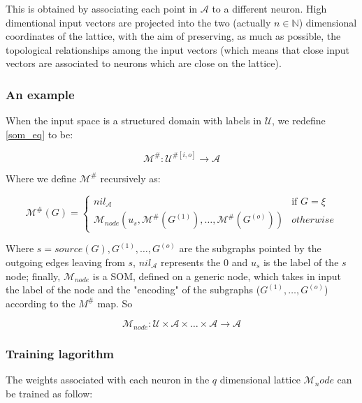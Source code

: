 This is obtained
by associating each point in $\mathcal{A}$ to a different neuron. High
dimentional input vectors are projected into the two (actually $n \in
\mathbb{N}$) dimensional coordinates of the lattice, with the aim of preserving,
as much as possible, the topological relationships among the input vectors
(which means that close input vectors are associated to neurons which are close
on the lattice).

\subsubsection{An example}

When the input space is a structured domain with labels in $\mathcal{U}$, we
redefine \autoref{som_eq} to be:

\begin{equation}
	\mathcal{M}^{\#}: \mathcal{U}^{\#[i,o]} \rightarrow \mathcal{A}
\end{equation}

Where we define $\mathcal{M}^{\#}$ recursively as:

\begin{equation}
	\mathcal{M}^{\#}(G) = 
		\begin{cases}
			nil_{\mathcal{A}} & \text{if } G=\xi \\
			\mathcal{M}_{node}(u_s, \mathcal{M}^{\#}(G^{(1)}), \dots, 
				\mathcal{M}^{\#}(G^{(o)})) & otherwise
		\end{cases}
\end{equation}

Where $s = source(G), G^{(1)}, \dots, G^{(o)}$ are the subgraphs pointed by the
outgoing edges leaving from $s$, $nil_{\mathcal{A}}$ represents the 0 and $u_s$
is the label of the $s$ node; finally, $\mathcal{M}_{node}$ is a SOM, defined on
a generic node, which takes in input the label of the node and the "encoding" of
the subgraphs ($G^{(1)}, \dots, G^{(o)}$) according to the $M^{\#}$ map. So 

\begin{equation}
	\mathcal{M}_{node}: \mathcal{U} \times \mathcal{A} \times \dots \times
	\mathcal{A} \rightarrow \mathcal{A}
\end{equation}

\subsubsection{Training lagorithm}

The weights associated with each neuron in the $q$ dimensional lattice
$\mathcal{M}_node$ can be trained as follow:

